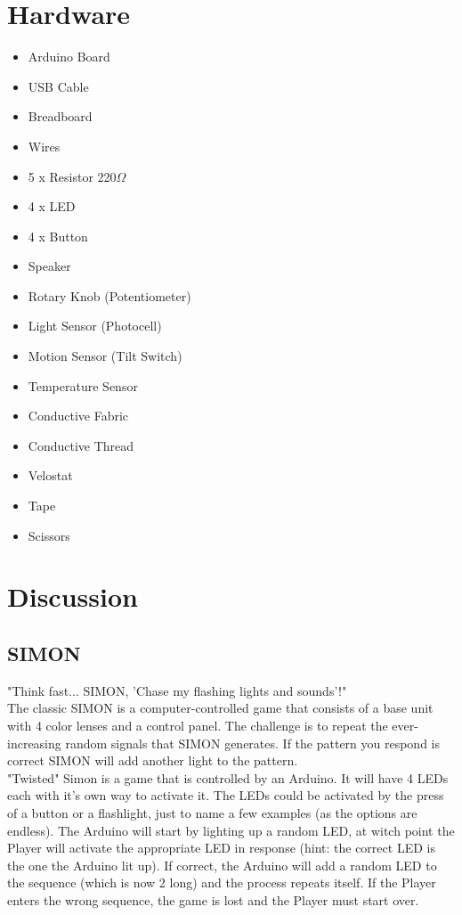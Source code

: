 \documentclass[12pt,letterpaper,oneside]{article}
\begin{document}
\section{Hardware}
		\begin{itemize} \parskip0pt
			\item Arduino Board
			\item USB Cable
			\item Breadboard
			\item Wires
			\item 5 x Resistor 220$\Omega$
			\item 4 x LED
			\item 4 x Button
			\item Speaker
			\item Rotary Knob (Potentiometer)
			\item Light Sensor (Photocell)
			\item Motion Sensor (Tilt Switch)
			\item Temperature Sensor
			\item Conductive Fabric
			\item Conductive Thread
			\item Velostat
			\item Tape
			\item Scissors
		\end{itemize}

\section{Discussion}

	\subsection{SIMON} \label{sec:simon}
"Think fast... SIMON, 'Chase my flashing lights and sounds'!"\bigskip
\\The classic SIMON is a computer-controlled game that consists of a base unit with 4 color lenses and a control panel. The challenge is to repeat the ever-increasing random signals that SIMON generates. If the pattern you respond is correct SIMON will add another light to the pattern.\bigskip
\\"Twisted" Simon is a game that is controlled by an Arduino. It will have 4 LEDs each with it's own way to activate it. The LEDs could be activated by the press of a button or a flashlight, just to name a few examples (as the options are endless). The Arduino will start by lighting up a random LED, at witch point the Player will activate the appropriate LED in response (hint: the correct LED is the one the Arduino lit up). If correct, the Arduino will add a random LED to the sequence (which is now 2 long) and the process repeats itself. If the Player enters the wrong sequence, the game is lost and the Player must start over.
\end{document}
